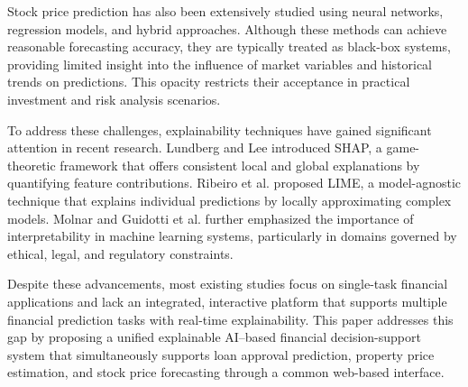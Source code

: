 Stock price prediction has also been extensively studied using neural networks, regression models, and hybrid approaches. Although these methods can achieve reasonable forecasting accuracy, they are typically treated as black-box systems, providing limited insight into the influence of market variables and historical trends on predictions. This opacity restricts their acceptance in practical investment and risk analysis scenarios. 

To address these challenges, explainability techniques have gained significant attention in recent research. Lundberg and Lee \cite{lundberg2017} introduced SHAP, a game-theoretic framework that offers consistent local and global explanations by quantifying feature contributions. Ribeiro et al. \cite{ribeiro2016} proposed LIME, a model-agnostic technique that explains individual predictions by locally approximating complex models. Molnar \cite{molnar2020} and Guidotti et al. \cite{guidotti2018} further emphasized the importance of interpretability in machine learning systems, particularly in domains governed by ethical, legal, and regulatory constraints. 

Despite these advancements, most existing studies focus on single-task financial applications and lack an integrated, interactive platform that supports multiple financial prediction tasks with real-time explainability. This paper addresses this gap by proposing a unified explainable AI--based financial decision-support system that simultaneously supports loan approval prediction, property price estimation, and stock price forecasting through a common web-based interface.

